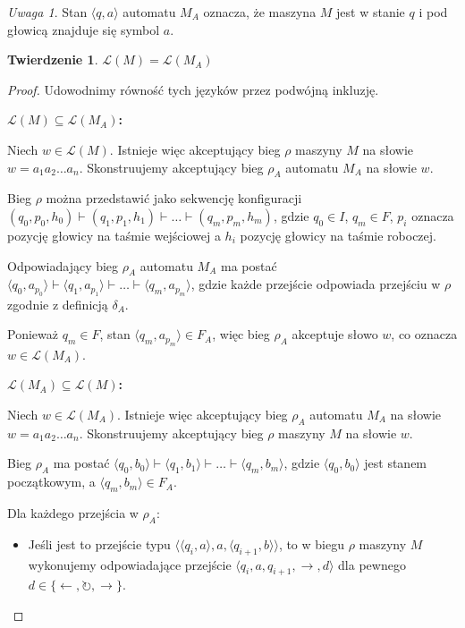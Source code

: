\documentclass{article}
\newtheorem{theorem}{Twierdzenie}[section]
\theoremstyle{definition}
\theoremstyle{remark}
\newtheorem{remark}{Uwaga}[section]
\begin{document}
\begin{remark}\label{remark:transition}
    Stan $\langle q,a \rangle$ automatu $M_A$ oznacza, że maszyna $M$ jest w stanie $q$ i pod głowicą znajduje się symbol $a$.
\end{remark}

\begin{theorem}
$\mathcal{L}(M) = \mathcal{L}(M_A)$
\end{theorem}

\begin{proof}
Udowodnimy równość tych języków przez podwójną inkluzję.

\medskip
\noindent\textbf{$\mathcal{L}(M) \subseteq \mathcal{L}(M_A)$:}

Niech $w \in \mathcal{L}(M)$. Istnieje więc akceptujący bieg $\rho$ maszyny $M$ na słowie $w = a_1a_2\ldots a_n$. 
Skonstruujemy akceptujący bieg $\rho_A$ automatu $M_A$ na słowie $w$.

Bieg $\rho$ można przedstawić jako sekwencję konfiguracji $(q_0, p_0, h_0) \vdash (q_1, p_1, h_1) \vdash \ldots \vdash (q_m, p_m, h_m)$, gdzie $q_0 \in I$, $q_m \in F$, $p_i$ oznacza pozycję głowicy na taśmie wejściowej a $h_i$ pozycję głowicy na taśmie roboczej.

Odpowiadający bieg $\rho_A$ automatu $M_A$ ma postać $\langle q_0, a_{p_0} \rangle \vdash \langle q_1, a_{p_1} \rangle \vdash \ldots \vdash \langle q_m, a_{p_m} \rangle$, gdzie każde przejście odpowiada przejściu w $\rho$ zgodnie z definicją $\delta_A$.

Ponieważ $q_m \in F$, stan $\langle q_m, a_{p_m} \rangle \in F_A$, więc bieg $\rho_A$ akceptuje słowo $w$, co oznacza $w \in \mathcal{L}(M_A)$.

\medskip
\noindent\textbf{$\mathcal{L}(M_A) \subseteq \mathcal{L}(M)$:}

Niech $w \in \mathcal{L}(M_A)$. Istnieje więc akceptujący bieg $\rho_A$ automatu $M_A$ na słowie $w = a_1a_2\ldots a_n$. 
Skonstruujemy akceptujący bieg $\rho$ maszyny $M$ na słowie $w$.

Bieg $\rho_A$ ma postać $\langle q_0, b_0 \rangle \vdash \langle q_1, b_1 \rangle \vdash \ldots \vdash \langle q_m, b_m \rangle$, gdzie $\langle q_0, b_0 \rangle$ jest stanem początkowym, a $\langle q_m, b_m \rangle \in F_A$.

Dla każdego przejścia w $\rho_A$:
\begin{itemize}
    \item Jeśli jest to przejście typu $\langle \langle q_i, a \rangle, a, \langle q_{i+1}, b \rangle \rangle$, to w biegu $\rho$ maszyny $M$ wykonujemy odpowiadające przejście $\langle q_i, a, q_{i+1}, \rightarrow, d \rangle$ dla pewnego $d \in \{\leftarrow, \circlearrowright, \rightarrow\}$.
    

\end{itemize}
\end{proof}
\end{document}
